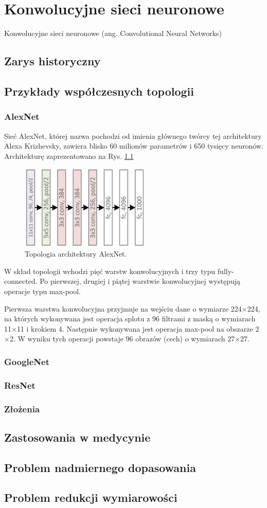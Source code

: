 \chapter{Konwolucyjne sieci neuronowe}
Konwolucyjne sieci neuronowe (ang. Convolutional Neural Networks)
\section{Zarys historyczny}
\section{Przykłady współczesnych topologii}
\subsection{AlexNet}
Sieć AlexNet, której nazwa pochodzi od imienia głównego twórcy tej architektury Alexa Krizhevsky, zawiera blisko 60 milionów parametrów i 650 tysięcy neuronów. Architekturę zaprezentowano na Rys. \ref{AlexNetTopology}
\begin{figure}[h!]
	\centering
	\includegraphics[width=0.55\textwidth]{figures/AlexNet.png}
	\caption{Topologia architektury AlexNet.}
	\label{AlexNetTopology}
\end{figure}

W skład topologii wchodzi pięć warstw konwolucyjnych i trzy typu fully-connected. Po pierwszej, drugiej i piątej warstwie konwolucyjnej występują operacje typu max-pool. 

Pierwsza warstwa konwolucyjna przyjmuje na wejściu dane o wymiarze 224$\times$224, na których wykonywana jest operacja splotu z 96 filtrami z maską o wymiarach 11$\times$11 i krokiem 4. Następnie wykonywana jest operacja max-pool na obszarze 2$\times$2. W wyniku tych operacji powstaje 96 obrazów (cech) o wymiarach 27$\times$27.


\subsection{GoogleNet}
\subsection{ResNet}
\subsection{Złożenia}
\section{Zastosowania w medycynie}
\section{Problem nadmiernego dopasowania}
\section{Problem redukcji wymiarowości}